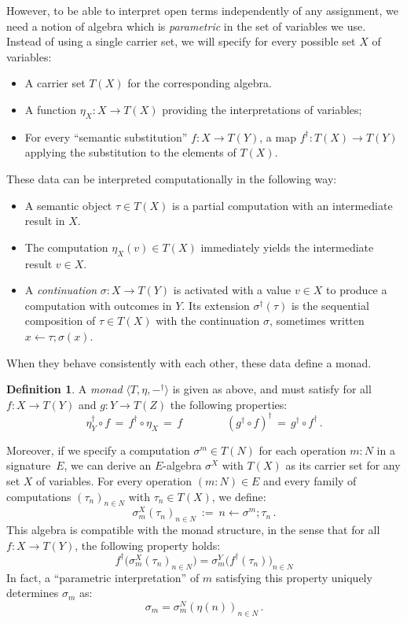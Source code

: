 \documentclass[11pt,oneside,draft]{book}
\theoremstyle{definition}
\newtheorem{definition}[theorem]{Definition}
\begin{document}
However,
to be able to interpret open terms
independently of any assignment,
we need a notion of algebra which is \emph{parametric}
in the set of variables we use.
Instead of using a single carrier set,
we will specify for every possible
set $X$ of variables:
\begin{itemize}
  \item A carrier set $T(X)$ for the corresponding algebra.
  \item A function $\eta_X : X \rightarrow T(X)$
    providing the interpretations of variables;
  \item For every ``semantic substitution''
    $f : X \rightarrow T(Y)$,
    a map $f^\dagger : T(X) \rightarrow T(Y)$
    applying the substitution to the elements of $T(X)$.
\end{itemize}
These data can be interpreted computationally in the following way:
\begin{itemize}
  \item
    A semantic object $\tau \in T(X)$
    is a partial computation
    with an intermediate result in $X$.
  \item
    The computation $\eta_X(v) \in T(X)$
    immediately yields the intermediate result $v \in X$.
  \item
    A \emph{continuation} $\sigma : X \rightarrow T(Y)$
    is activated with a value $v \in X$
    to produce a computation with outcomes in $Y$.
    Its extension $\sigma^\dagger(\tau)$
    is the sequential composition
    of $\tau \in T(X)$
    with the continuation $\sigma$,
    sometimes written
    $x \mathop{\leftarrow} \tau \mathop{;} \sigma(x)$.
\end{itemize}
When they behave consistently with each other,
these data define a monad.

\begin{definition} \label{def:setmonad}
A \emph{monad} $\langle T, \eta, {-}^\dagger \rangle$
is given as above,
and must satisfy
for all $f : X \rightarrow T(Y)$ and
$g : Y \rightarrow T(Z)$
the following properties:
\[
  \eta_Y^\dagger \circ f \, = \,
  f^\dagger \circ \eta_X \, = \,
  f
  \qquad \qquad
  (g^\dagger \circ f)^\dagger \, = \,
  g^\dagger \circ f^\dagger
  \,.
\]
\end{definition}

Moreover,
if we specify
a computation $\sigma^m \in T(N)$
for each operation $m \mathop{:} N$
in a signature~$E$,
we can derive
an $E$-algebra $\sigma^X$ with $T(X)$ as its carrier set
for any set $X$ of variables.
For every operation $(m \mathop{:} N) \in E$
and every family of computations $(\tau_n)_{n \in N}$
with $\tau_n \in T(X)$,
we define:
\[
  \sigma^X_m(\tau_n)_{n \in N} \: := \:
    n \mathop{\leftarrow} \sigma^m \mathop{;} \tau_n
  \,.
\]
This algebra is compatible with the monad structure,
in the sense that for all $f : X \rightarrow T(Y)$,
the following property holds:
\[
  f^\dagger \big( \sigma^X_m(\tau_n)_{n \in N} \big) =
    \sigma^Y_m \big( f^\dagger(\tau_n) \big)_{n \in N}
\]
In fact,
a ``parametric interpretation'' of $m$
satisfying this property
uniquely determines $\sigma_m$ as:
\[
  \sigma_m = \sigma_m^N(\eta(n))_{n \in N}
  \,.
\]
\end{document}
